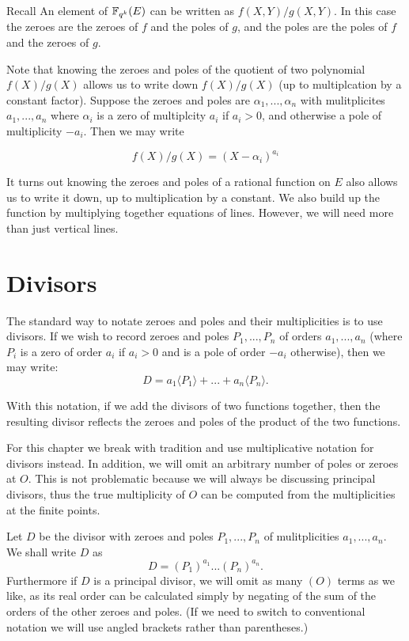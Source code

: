 Recall An element of $\mathbb{F}_{q^k}(E)$ can be written as $f(X,Y)/g(X,Y)$.
In this case the zeroes are the zeroes of $f$ and the poles of $g$,
and the poles are the poles of $f$ and the zeroes of $g$.

Note that knowing the zeroes and poles of the quotient of two
polynomial $f(X)/g(X)$ allows us to write down $f(X)/g(X)$ (up to multiplcation
by a constant factor). Suppose the zeroes and poles are $\alpha_1,...,\alpha_n$
with mulitplicites $a_1,...,a_n$ where $\alpha_i$ is a zero of multiplcity
$a_i$ if $a_i > 0$, and otherwise a pole of multiplicity $-a_i$. Then
we may write

\[ f(X)/g(X) = (X-\alpha_i)^{a_i} \]

It turns out knowing the zeroes and poles of
a rational function on $E$ also allows us to write it down,
up to multiplication by a constant. We also build up the function by
multiplying together equations of lines. However, we will need more than
just vertical lines.

\section {Divisors}

The standard way to notate zeroes and poles and their multiplicities
is to use divisors.
If we wish to record zeroes and poles $P_1,...,P_n$
of orders $a_1,...,a_n$ (where $P_i$ is a zero of order
$a_i$ if $a_i > 0$ and is a pole of order $-a_i$ otherwise), then
we may write:
\[ D = a_1\langle P_1\rangle + ... + a_n \langle P_n\rangle .\]

With this notation, if we add the divisors of two functions together,
then the resulting divisor reflects the zeroes and poles of the product
of the two functions.

For this chapter we break with tradition and use multiplicative
notation for divisors instead. In addition, we will omit an arbitrary
number of poles or zeroes at $O$. This is not problematic because we
will always be discussing principal divisors, thus the true multiplicity
of $O$ can be computed from the multiplicities at the finite points.

Let $D$ be the divisor with zeroes and poles $P_1,...,P_n$
of mulitplicities $a_1,...,a_n$.
We shall write $D$ as
\[ D = (P_1)^{a_1} ... (P_n)^{a_n} . \]
Furthermore if $D$ is a principal divisor, we will
omit as many $(O)$ terms as we like, as its real order
can be calculated simply by negating
of the sum of the orders of the other zeroes and poles.
(If we need to switch to conventional notation we will use angled brackets
rather than parentheses.)

